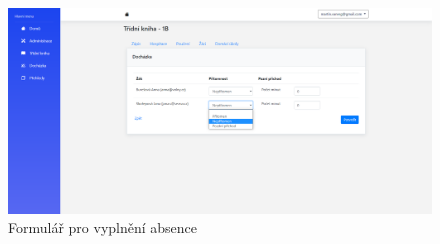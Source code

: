 \begin{figure}
	\centering
	\includegraphics[width=\textwidth]{images/app_samples/tridni-kniha-absence.png}
	\caption{Formulář pro vyplnění absence}
	\label{tridni-kniha-absence}
\end{figure}